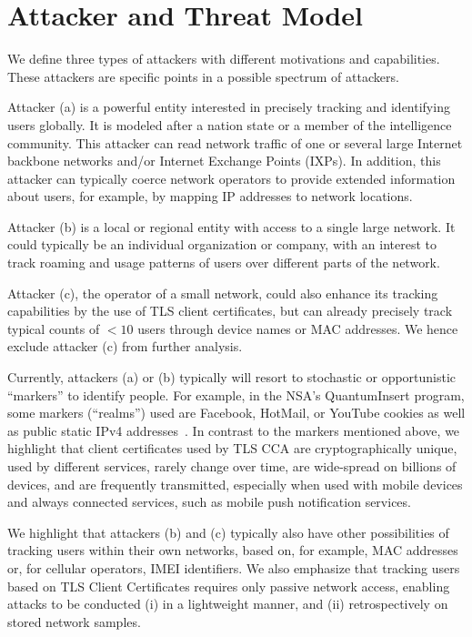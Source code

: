 \section{Attacker and Threat Model}\label{sec:attacker}
We define three types of attackers with different motivations and capabilities. 
These attackers are specific points in a possible spectrum of attackers.

Attacker (a) is a powerful entity interested in precisely tracking and identifying users globally.
It is modeled after a nation state or a member of the intelligence community.
This attacker can read network traffic of one or several large Internet backbone networks and/or Internet Exchange Points (IXPs).
In addition, this attacker can typically coerce network operators to provide extended information about users, for example, by mapping IP addresses to network locations.

Attacker (b) is a local or regional entity with access to a single large network.
It could typically be an individual organization or company, with an interest to track roaming and usage patterns of users over different parts of the network.

Attacker (c), the operator of a small network, could also enhance
its tracking capabilities by the use of TLS client certificates, but can already
precisely track typical counts of $<$$10$ users through device names or MAC
addresses. We hence exclude attacker (c) from further analysis.

Currently, attackers (a) or (b) typically will resort to stochastic or opportunistic ``markers'' to identify people.
For example, in the NSA's QuantumInsert program, some markers (``realms'') used are Facebook, HotMail, or YouTube cookies as well as public static IPv4 addresses~\cite[p. 5]{effqi}.
In contrast to the markers mentioned above, we highlight that client certificates used by TLS CCA are cryptographically unique, used by different services, rarely change over time, are wide-spread on billions of devices, and are frequently transmitted, especially when used with mobile devices and always connected services, such as mobile push notification services.

We highlight that attackers (b) and (c) typically also have other possibilities of tracking users within their own networks, based on, for example, MAC addresses or, for cellular operators, IMEI identifiers.
We also emphasize that tracking users based on TLS Client Certificates requires only passive network access, enabling attacks to be conducted (i) in a lightweight manner, and (ii) retrospectively on stored network samples.